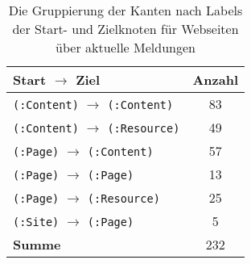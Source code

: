         \begin{table}[!h]
            \centering
            \begin{tabular}{|l|c|}
                \hline
                \textbf{Start $\rightarrow$ Ziel} & \multicolumn{1}{l|}{\textbf{Anzahl}} \\ \hline
                \texttt{(:Content)} $\rightarrow$ \texttt{(:Content)}     & 83                                   \\ \hline
                \texttt{(:Content)} $\rightarrow$ \texttt{(:Resource)}    & 49                                   \\ \hline
                \texttt{(:Page)} $\rightarrow$ \texttt{(:Content)}        & 57                                   \\ \hline
                \texttt{(:Page)} $\rightarrow$ \texttt{(:Page)}           & 13                                   \\ \hline
                \texttt{(:Page)} $\rightarrow$ \texttt{(:Resource)}       & 25                                   \\ \hline
                \texttt{(:Site)} $\rightarrow$ \texttt{(:Page)}           & 5                                    \\ \hline
                \textbf{Summe}                    & 232                                  \\ \hline
            \end{tabular}
            \caption{Die Gruppierung der Kanten nach Labels der Start- und Zielknoten für Webseiten über aktuelle Meldungen}
            \label{table:findingsNewsFiguresEdgesByStartEndNodeLabel}
        \end{table}

